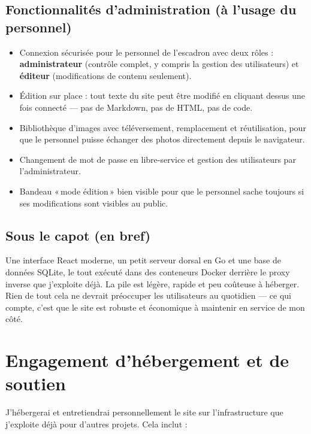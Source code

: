 \documentclass[11pt,letterpaper]{article}
\begin{document}
\subsection{Fonctionnalités d'administration (à l'usage du personnel)}
\begin{itemize}[leftmargin=1.4em,itemsep=0.25em]
  \item Connexion sécurisée pour le personnel de l'escadron avec deux rôles : \textbf{administrateur} (contrôle complet, y compris la gestion des utilisateurs) et \textbf{éditeur} (modifications de contenu seulement).
  \item Édition sur place : tout texte du site peut être modifié en cliquant dessus une fois connecté --- pas de Markdown, pas de HTML, pas de code.
  \item Bibliothèque d'images avec téléversement, remplacement et réutilisation, pour que le personnel puisse échanger des photos directement depuis le navigateur.
  \item Changement de mot de passe en libre-service et gestion des utilisateurs par l'administrateur.
  \item Bandeau «\,mode édition\,» bien visible pour que le personnel sache toujours si ses modifications sont visibles au public.
\end{itemize}

\subsection{Sous le capot (en bref)}
Une interface React moderne, un petit serveur dorsal en Go et une base de données SQLite, le tout exécuté dans des conteneurs Docker derrière le proxy inverse que j'exploite déjà. La pile est légère, rapide et peu coûteuse à héberger. Rien de tout cela ne devrait préoccuper les utilisateurs au quotidien --- ce qui compte, c'est que le site est robuste et économique à maintenir en service de mon côté.

\section{Engagement d'hébergement et de soutien}\label{sec:engagement}

J'hébergerai et entretiendrai personnellement le site sur l'infrastructure que j'exploite déjà pour d'autres projets. Cela inclut :
\end{document}
